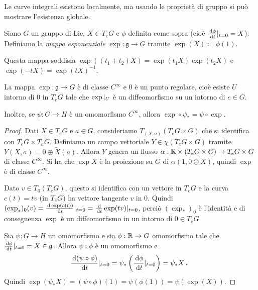 \begin{remark}
	Le curve integrali esistono localmente, ma usando le proprietà di gruppo  si può mostrare l'esistenza globale.
\end{remark}


\begin{definition} 
	Siano $G$ un gruppo di Lie, $X\in T_eG$ e $\phi$ definita come sopra (cioè $\frac{\,\mathrm d\phi}{\,\mathrm d t}|_{t=0} =X$). Definiamo la \emph{mappa esponenziale} $\exp: \mathfrak g \to G$ tramite $\exp(X) \coloneqq \phi(1)$.
\end{definition}

\begin{remark}
Questa mappa soddisfa $\exp((t_1+t_2)X) = \exp(t_1X) \exp(t_2X)$ e $\exp(-tX) = \exp(tX)^{-1}$.
\end{remark}

\begin{proposition} \label{prop:ProprietaExp}
	La mappa $\exp: \mathfrak g \to G$ è di classe $C^\infty$ e 0 è un punto regolare, cioè esiste $U$ intorno di 0 in $T_eG$ tale che $\exp|_ U$ è un diffeomorfismo su un intorno di $e\in G$.
	
	Inoltre, se $\psi : G \to H$ è un omomorfismo $C^\infty$, allora $\exp\circ \psi_* = \psi \circ \exp$.
\end{proposition}
\begin{proof}
	Dati $X \in T_eG$ e $a \in G$, consideriamo $T_{(X,a)}(T_eG\times G)$ che si identifica con $T_eG \times T_a G$.
	Definiamo un campo vettoriale $Y \in \chi(T_eG \times G)$ tramite $Y(X,a) = 0 \oplus \tilde X(a)$.
	Allora $Y$ genera un flusso $\alpha: \mathbb R \times (T_eG \times G) \to T_eG \times G$ di classe $C^\infty$. Si ha che $\exp X$ è la proiezione su $G$ di $\alpha(1,0\oplus X)$, quindi $\exp$ è di classe $C^\infty$.
	
	Dato $v\in T_0(T_eG)$, questo si identifica con un vettore in $T_eG$ e la curva $c(t) = tv$ (in $T_eG$) ha vettore tangente $v$ in 0.
	Quindi $(\exp_*)_0 (v) = \frac{\,\mathrm d \exp(c(t))}{\,\mathrm d t}|_ {t=0} = \frac{\,\mathrm d}{\,\mathrm d t} \exp(tv)|_ {t=0}$, perciò $(\exp_*)_0$ è l'identità e di conseguenza $\exp$ è un diffeomorfismo in un intorno di $0\in T_eG$.
	
	Sia $\psi: G \to H$ un omomorfismo e sia $\phi: \mathbb R \to G$ omomorfismo tale che $\frac{\,\mathrm d \phi}{\,\mathrm d t}|_{t=0} = X \in \mathfrak g$.
	Allora $\psi \circ \phi$ è un omomorfismo e 
	\begin{equation*}
		\frac{\,\mathrm d(\psi\circ \phi)}{\,\mathrm d t}|_{t=0} = \psi_*\left(\frac{\,\mathrm d \phi}{\,\mathrm d t}|_{t=0}\right) = \psi_*X\, \text{. }
	\end{equation*}
	Quindi $\exp(\psi_*X) = (\psi\circ\phi)(1) = \psi(\phi(1)) = \psi(\exp(X))$.
\end{proof}


